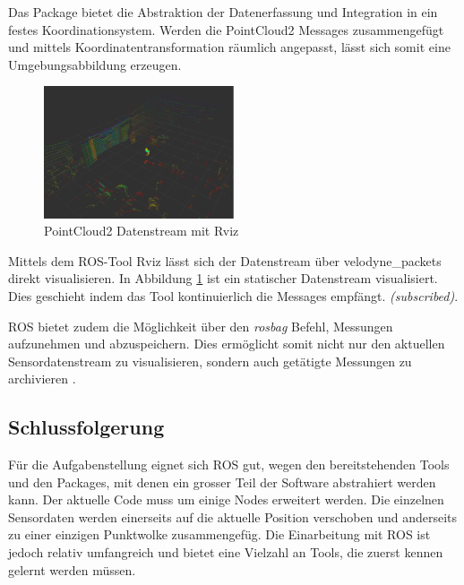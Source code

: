 Das Package bietet die Abstraktion der Datenerfassung und Integration in ein festes Koordinationsystem. Werden die PointCloud2 Messages zusammengefügt und mittels Koordinatentransformation räumlich angepasst, lässt sich somit eine Umgebungsabbildung erzeugen.

\begin{figure}[H]
	\centering
	\includegraphics[width=0.5\textwidth]{resources/rviz.PNG}
	\caption[PointCloud2 Datenstream mit Rviz]{PointCloud2 Datenstream mit Rviz}
	\label{fig:rviz}
\end{figure} 

Mittels dem ROS-Tool Rviz lässt sich der Datenstream über velodyne\_packets direkt visualisieren. In Abbildung \ref{fig:rviz} ist ein statischer Datenstream visualisiert. Dies geschieht indem das Tool kontinuierlich die Messages empfängt. \textit{(subscribed)}. 

ROS bietet zudem die Möglichkeit über den \textit{rosbag} Befehl, Messungen aufzunehmen und abzuspeichern. Dies ermöglicht somit nicht nur den aktuellen Sensordatenstream zu visualisieren, sondern auch getätigte Messungen zu archivieren \cite{ROSTutorials}. 

\subsection{Schlussfolgerung}
Für die Aufgabenstellung eignet sich ROS gut, wegen den bereitstehenden Tools und den Packages, mit denen ein grosser Teil der Software abstrahiert werden kann. Der aktuelle Code muss um einige Nodes erweitert werden. Die einzelnen Sensordaten werden einerseits auf die aktuelle Position verschoben und anderseits zu einer einzigen Punktwolke zusammengefüg. Die Einarbeitung mit ROS ist jedoch relativ umfangreich und bietet eine Vielzahl an Tools, die zuerst kennen gelernt werden müssen.  

